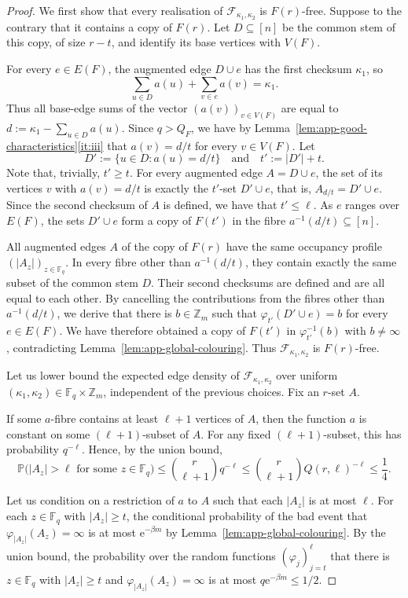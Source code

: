 \documentclass[10pt,a4paper]{article}
\numberwithin{equation}{section}
\theoremstyle{definition}
\theoremstyle{remark}
\newcommand{\Z}[1]{\mathbb Z_{#1}}
\newcommand{\me}{\mathrm{e}}
\newcommand{\n}[2]{|#2_{#1}|}
\newcommand{\F}[2]{\mathcal F_{#1,#2}}
\newcommand{\PP}{m}
\begin{document}
\begin{proof}
We first show that every realisation of $\F{\kappa_1}{\kappa_2}$ is $F(r)$-free.  Suppose to the contrary that it contains a copy of $F(r)$.  Let $D\subseteq [n]$ be the common stem of this copy, of size $r-t$, and identify its base vertices with $V(F)$.


For every $e\in E(F)$, the augmented edge $D\cup e$ has the first checksum $\kappa_1$, so
\[
 \sum_{u\in D}a(u)+\sum_{v\in e}a(v)=\kappa_1.
\]
Thus all base-edge sums of the vector $(a(v))_{v\in V(F)}$ are equal to $d:=\kappa_1-\sum_{u\in D}a(u)$.
Since $q>Q_F$, we have by Lemma~\ref{lem:app-good-characteristics}\ref{it:iii} that 
 $a(v)=d/t$ for every $v\in V(F)$.
Let
\[
 D':=\{u\in D:a(u)=d/t\}
 \quad\text{and}\quad t':=|D'|+t.
\]
 Note that, trivially, $t'\ge t$.
For every augmented edge $A=D\cup e$, the set of its vertices $v$ with $a(v)=d/t$ is exactly the $t'$-set $D'\cup e$, that is, $A_{d/t}=D'\cup e$. Since the second checksum of $A$ is defined, we have that $t'\le \ell$.   As $e$ ranges over $E(F)$, the sets $D'\cup e$ form a copy of $F(t')$ in the fibre $a^{-1}(d/t)\subseteq [n]$. 

All augmented edges $A$ of the copy of $F(r)$ have the same  occupancy profile $(\n{z}{A})_{z\in\mathbb F_q}$.  In every fibre other than $a^{-1}(d/t)$, they contain exactly the same subset of the common stem $D$. Their second checksums are defined and are all equal to each other. By cancelling the contributions from the fibres other than $a^{-1}(d/t)$, we derive that there is $b\in \Z{\PP}$ such that $\varphi_{t'}(D'\cup e)=b$ for every $e\in E(F)$.
We have therefore obtained a copy of $F(t')$ in $\varphi_{t'}^{-1}(b)$ with $b\not=\infty$, contradicting Lemma~\ref{lem:app-global-colouring}.  Thus $\F{\kappa_1}{\kappa_2}$ is $F(r)$-free.

Let us lower bound the expected edge density of $\F{\kappa_1}{\kappa_2}$ over uniform $(\kappa_1,\kappa_2)\in \mathbb F_q\times\Z{\PP}$, independent of the previous choices. Fix an $r$-set $A$.


If some $a$-fibre contains at least $\ell+1$ vertices of $A$, then the function $a$ is constant on some $(\ell+1)$-subset of $A$. For any fixed $(\ell+1)$-subset, this has probability $q^{-\ell}$.  Hence, by the union bound,
\begin{equation*}
 \mathbb P\bigl(\n{z}{A}>\ell\text{ for some }z\in\mathbb F_q\bigr)
 \le\binom r{\ell+1}q^{-\ell}
 \le\binom r{\ell+1}Q(r,\ell)^{-\ell}
 \le\frac14.
\end{equation*}

Let us condition on a restriction of $a$ to $A$ such that
each $\n{z}{A}$ is at most $\ell$. For each $z\in\mathbb F_q$ with $\n{z}{A}\ge t$, the conditional probability of the bad event that $\varphi_{\n{z}{A}}(A_z)=\infty$ is at most $\me^{-\beta \PP}$ by Lemma~\ref{lem:app-global-colouring}. 
By the union bound, the probability over the random functions $(\varphi_j)_{j=t}^{\ell}$ that there is $z\in\mathbb F_q$ with $\n{z}{A}\ge t$ and $\varphi_{\n{z}{A}}(A_z)=\infty$
is at most $q\me^{-\beta \PP}\le 1/2$. 


\end{proof}
\end{document}
